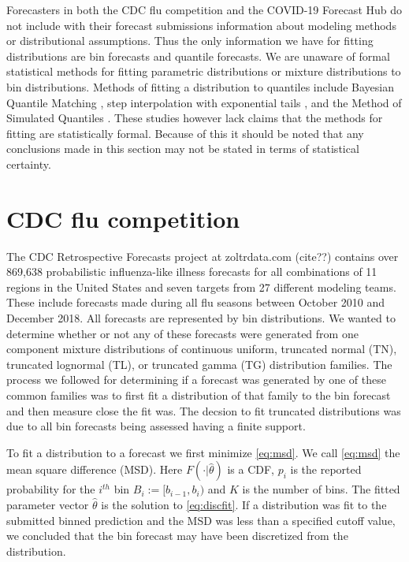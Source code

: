 \documentclass[11pt,notitlepage]{isuthesis}
\begin{document}
Forecasters in both the CDC flu competition and the COVID-19 Forecast Hub do 
not include with their forecast submissions information about modeling methods 
or 
distributional assumptions. Thus the only information we have for fitting
distributions are bin
forecasts and quantile forecasts. We are unaware of formal statistical 
methods for fitting parametric distributions or mixture distributions to bin
distributions. Methods of fitting a distribution to quantiles 
include Bayesian Quantile Matching
\cite{nirwan2020bayesian}, step interpolation with exponential tails 
\cite{quinonero2005evaluating},
and the Method of Simulated Quantiles 
\cite{dominicy2013method}. These studies however lack claims that the methods
for fitting are statistically formal.
Because of this it should be noted that any conclusions made in 
this section may not be 
stated in terms of statistical certainty.



\section{CDC flu competition}
The CDC Retrospective Forecasts project at zoltrdata.com (cite??) contains over
869,638 probabilistic influenza-like illness forecasts for all combinations
of 11 regions 
in the United States and seven targets from 27 different modeling teams. These
include forecasts made during all flu seasons between October 2010 and December
2018. All forecasts are represented by bin distributions. 
We wanted to determine whether or not any of these forecasts were
generated from one component mixture distributions of continuous uniform, 
truncated normal (TN), truncated
lognormal (TL), or truncated gamma (TG) distribution families.
The process we followed for determining if a forecast was generated by one of
these common families was to first fit a distribution of that family to the bin
forecast and then measure close the fit was. The decsion to fit truncated 
distributions was due to all bin forecasts being assessed having a finite 
support.

To fit a distribution to a forecast we first minimize \eqref{eq:msd}. We call
\eqref{eq:msd} the mean square difference (MSD).
Here $F(\cdot| \hat{\theta})$ is a CDF, $p_i$ is the reported probability for 
the $i^{th}$ bin $B_i := [b_{i-1}, b_i)$ and $K$ is the number of bins.
The fitted parameter vector $\hat{\theta}$ is the solution to 
\eqref{eq:discfit}.
If a distribution was fit to the submitted binned 
prediction
and the MSD was less than a 
specified cutoff value, we
concluded that the bin forecast may have been discretized from the 
distribution.
\end{document}
